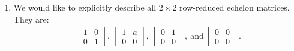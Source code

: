 \documentclass[12pt]{article}
\begin{document}
\begin{enumerate}
  \item
    We would like to explicitly describe all $2 \times 2$
    row-reduced echelon matrices. They are:
    \begin{align*}
      \begin{bmatrix}
        1 & 0\\
        0 & 1
      \end{bmatrix},\ 
      \begin{bmatrix}
        1 & a\\
        0 & 0
      \end{bmatrix},\ 
      \begin{bmatrix}
        0 & 1\\
        0 & 0
      \end{bmatrix},\ \text{and}\ 
      \begin{bmatrix}
        0 & 0\\
        0 & 0
      \end{bmatrix}.
    \end{align*}
\end{enumerate}
\end{document}
